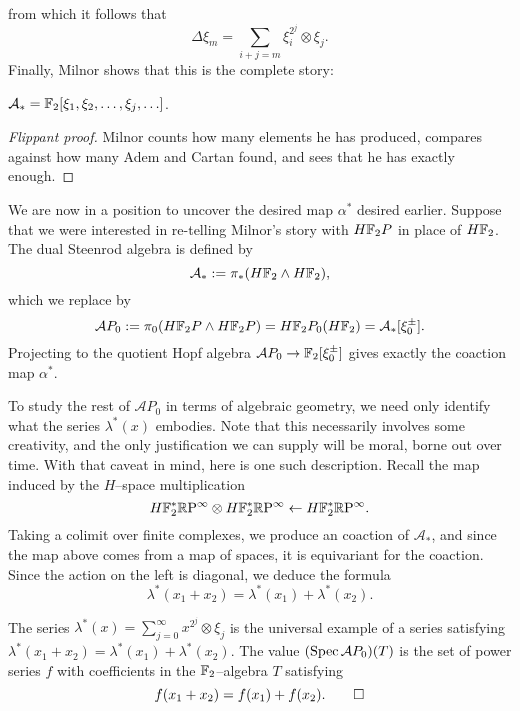 from which it follows that \[\Delta \xi_m = \sum_{i+j=m} \xi_i^{2^j} \otimes \xi_j.\]  Finally, Milnor shows that this is the complete story:
\begin{theorem}[Milnor]
$\mathcal A_* = \mathbb F_2[\xi_1, \xi_2, \ldots, \xi_j, \ldots]$.
\end{theorem}
\begin{proof}[Flippant proof]
Milnor counts how many elements he has produced, compares against how many Adem and Cartan found, and sees that he has exactly enough.
\end{proof}

We are now in a position to uncover the desired map $\alpha^*$ desired earlier.  Suppose that we were interested in re-telling Milnor's story with $H\mathbb F_2P$ in place of $H\mathbb F_2$.  The dual Steenrod algebra is defined by \[\mathcal A_* := \pi_*(H\mathbb F_2 \wedge H\mathbb F_2),\] which we replace by \[\mathcal AP_0 := \pi_0 (H\mathbb F_2 P \wedge H\mathbb F_2 P) = H\mathbb F_2P_0(H\mathbb F_2) = \mathcal A_*[\xi_0^\pm].\]  Projecting to the quotient Hopf algebra $\mathcal AP_0 \to \mathbb F_2[\xi_0^\pm]$ gives exactly the coaction map $\alpha^*$.

To study the rest of $\mathcal AP_0$ in terms of algebraic geometry, we need only identify what the series $\lambda^*(x)$ embodies.  Note that this necessarily involves some creativity, and the only justification we can supply will be moral, borne out over time.  With that caveat in mind, here is one such description.  Recall the map induced by the $H$--space multiplication \[H\mathbb F_2^* \mathbb R\mathrm P^\infty \otimes H\mathbb F_2^* \mathbb R\mathrm P^\infty \leftarrow H\mathbb F_2^* \mathbb R\mathrm P^\infty.\]  Taking a colimit over finite complexes, we produce an coaction of $\mathcal A_*$, and since the map above comes from a map of spaces, it is equivariant for the coaction.  Since the action on the left is diagonal, we deduce the formula \[\lambda^*(x_1 + x_2) = \lambda^*(x_1) + \lambda^*(x_2).\]

\begin{lemma}
The series $\lambda^*(x) = \sum_{j=0}^\infty x^{2^j} \otimes \xi_j$ is the universal example of a series satisfying $\lambda^*(x_1 + x_2) = \lambda^*(x_1) + \lambda^*(x_2)$.  The value $(\operatorname{Spec} \mathcal AP_0)(T)$ is the set of power series $f$ with coefficients in the $\mathbb F_2$--algebra $T$ satisfying \[f(x_1 + x_2) = f(x_1) + f(x_2). \qed\]
\end{lemma}

